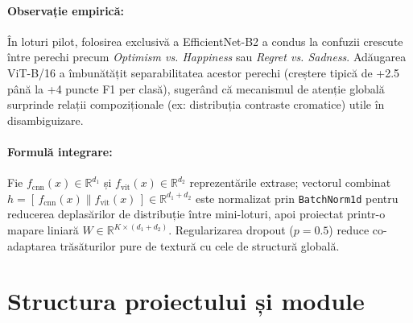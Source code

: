 \paragraph{Observație empirică:} În loturi pilot, folosirea exclusivă a EfficientNet-B2 a condus la confuzii crescute între perechi precum \emph{Optimism vs. Happiness} sau \emph{Regret vs. Sadness}. Adăugarea ViT-B/16 a îmbunătățit separabilitatea acestor perechi (creștere tipică de +2.5 până la +4 puncte F1 per clasă), sugerând că mecanismul de atenție globală surprinde relații compoziționale (ex: distribuția contraste cromatice) utile în disambiguizare.

\paragraph{Formulă integrare:} Fie $f_{\text{cnn}}(x)\in\mathbb{R}^{d_1}$ și $f_{\text{vit}}(x)\in\mathbb{R}^{d_2}$ reprezentările extrase; vectorul combinat $h = [\,f_{\text{cnn}}(x) \parallel f_{\text{vit}}(x)\,] \in \mathbb{R}^{d_1 + d_2}$ este normalizat prin \texttt{BatchNorm1d} pentru reducerea deplasărilor de distribuție între mini-loturi, apoi proiectat printr-o mapare liniară $W \in \mathbb{R}^{K\times(d_1+d_2)}$. Regularizarea dropout ($p=0.5$) reduce co-adaptarea trăsăturilor pure de textură cu cele de structură globală.

\section{Structura proiectului și module}\label{sec:structura}

